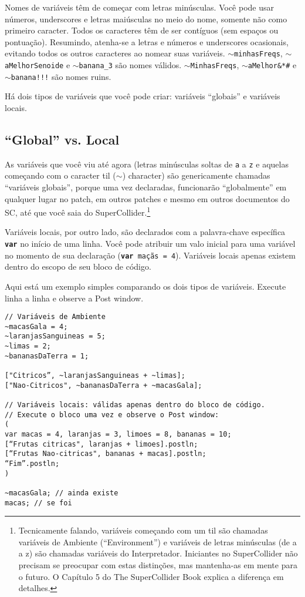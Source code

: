 Nomes de variáveis têm de começar com letras minúsculas. Você pode usar números, underscores e letras maiúsculas no meio do nome, somente não como primeiro caracter. Todos os caracteres têm de ser contíguos (sem espaços ou pontuação). Resumindo, atenha-se a letras e números e underscores ocasionais, evitando todos os outros caracteres ao nomear suas variáveis. \texttt{$\sim$minhasFreqs}, \texttt{$\sim$aMelhorSenoide} e \texttt{$\sim$banana\_3} são nomes válidos. \texttt{$\sim$MinhasFreqs}, \texttt{$\sim$aMelhor\&*\#\@Senoide} e \texttt{$\sim$banana!!!} são nomes ruins.

Há dois tipos de variáveis que você pode criar: variáveis “globais” e variáveis locais.

\subsection{“Global” vs. Local}

As variáveis que você viu até agora (letras minúsculas soltas de \texttt{a} a \texttt{z} e aquelas começando com o caracter til ($\sim$) character) são genericamente chamadas “variáveis globais”, porque uma vez declaradas, funcionarão “globalmente” em qualquer lugar no patch, em outros patches e mesmo em outros documentos do SC, até que você saia do SuperCollider.\footnote{Tecnicamente falando, variáveis começando com um til são chamadas variáveis de Ambiente (“Environment”) e variáveis de letras minúsculas (de a a z) são chamadas variáveis do Interpretador. Iniciantes no SuperCollider não precisam se preocupar com estas distinções, mas mantenha-as em mente para o futuro. O Capítulo 5 do The SuperCollider Book explica a diferença em detalhes.}

Variáveis locais, por outro lado, são declarados com a palavra-chave específica \texttt{\textbf{var}} no início de uma linha. Você pode atribuir um valo inicial para uma variável no momento de sua declaração (\texttt{\textbf{var} maçãs = 4}). Variáveis locais apenas existem dentro do escopo de seu bloco de código.

Aqui está um exemplo simples comparando os dois tipos de variáveis. Execute linha a linha e observe a Post window.

 
\begin{lstlisting}[style=SuperCollider-IDE, basicstyle=\scttfamily\footnotesize]
// Variáveis de Ambiente
~macasGala = 4;
~laranjasSanguineas = 5;
~limas = 2;
~bananasDaTerra = 1;

["Citricos”, ~laranjasSanguineas + ~limas];
["Nao-Citricos", ~bananasDaTerra + ~macasGala];

// Variáveis locais: válidas apenas dentro do bloco de código.
// Execute o bloco uma vez e observe o Post window:
(
var macas = 4, laranjas = 3, limoes = 8, bananas = 10;
[“Frutas citricas", laranjas + limoes].postln;
[“Frutas Nao-citricas", bananas + macas].postln;
“Fim”.postln;
)

~macasGala; // ainda existe
macas; // se foi
\end{lstlisting}

